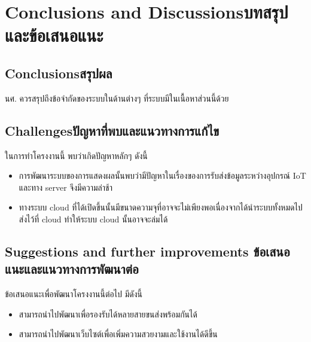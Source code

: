 \chapter{\ifenglish Conclusions and Discussions\else บทสรุปและข้อเสนอแนะ\fi}

\section{\ifenglish Conclusions\else สรุปผล\fi}

นศ. ควรสรุปถึงข้อจำกัดของระบบในด้านต่างๆ ที่ระบบมีในเนื้อหาส่วนนี้ด้วย

\section{\ifenglish Challenges\else ปัญหาที่พบและแนวทางการแก้ไข\fi}

ในการทำโครงงานนี้ พบว่าเกิดปัญหาหลักๆ ดังนี้
\begin{itemize}
    \item การพัฒนาระบบของการแสดงผลนั้นพบว่ามีปัญหาในเรื่องของการรับส่งข้อมูลระหว่างอุปกรณ์ IoT และทาง server จึงมีความล่าช้า
    \item ทางระบบ cloud ที่ได้เปิดขึ้นนั้นมีขนาดความจุที่อาจจะไม่เพียงพอเนื่องจากได้นำระบบทั้งหมดไปส่งไว้ที่ cloud ทำให้ระบบ cloud นั้นอาจจะล่มได้
  \end{itemize}
\section{\ifenglish%
Suggestions and further improvements
\else%
ข้อเสนอแนะและแนวทางการพัฒนาต่อ
\fi
}

ข้อเสนอแนะเพื่อพัฒนาโครงงานนี้ต่อไป มีดังนี้
\begin{itemize}
    \item สามารถนำไปพัฒนาเพื่อรองรับได้หลายสายขนส่งพร้อมกันได้
    \item สามารถนำไปพัฒนาเว็บไซต์เพื่อเพิ่มความสวยงามและใช้งานได้ดีขึ้น
  \end{itemize}
